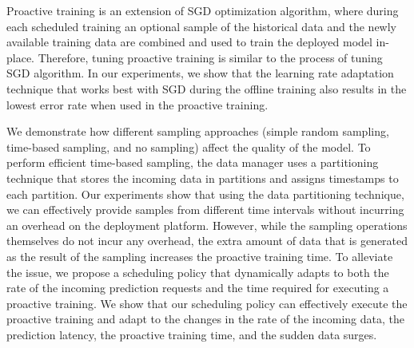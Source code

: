 Proactive training is an extension of SGD optimization algorithm, where during each scheduled training an optional sample of the historical data and the newly available training data are combined and used to train the deployed model in-place.
Therefore, tuning proactive training is similar to the process of tuning SGD algorithm.
In our experiments, we show that the learning rate adaptation technique that works best with SGD during the offline training also results in the lowest error rate when used in the proactive training.

We demonstrate how different sampling approaches (simple random sampling, time-based sampling, and no sampling) affect the quality of the model.
To perform efficient time-based sampling, the data manager uses a partitioning technique that stores the incoming data in partitions and assigns timestamps to each partition.
Our experiments show that using the data partitioning technique, we can effectively provide samples from different time intervals without incurring an overhead on the deployment platform.
However, while the sampling operations themselves do not incur any overhead, the extra amount of data that is generated as the result of the sampling increases the proactive training time.
To alleviate the issue, we propose a scheduling policy that dynamically adapts to both the rate of the incoming prediction requests and the time required for executing a proactive training.
We show that our scheduling policy can effectively execute the proactive training and adapt to the changes in the rate of the incoming data, the prediction latency, the proactive training time, and the sudden data surges.





